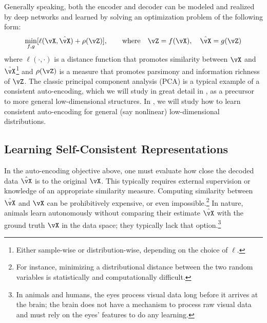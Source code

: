 \documentclass[../../book-main.tex]{subfiles}
\begin{document}
Generally speaking, both the encoder and decoder can be modeled and realized by deep networks and learned by solving an optimization problem of the following form:
\begin{equation}
   \min_{f, g} [\ell(\vX, \hat{\vX}) + \rho(\vZ)], \qquad \text{where} \quad \vZ = f(\vX), \quad \hat{\vX} = g(\vZ)
   \label{eqn:auto-encoding-objective}
\end{equation}
where \(\ell(\cdot, \cdot)\) is a distance function that promotes similarity between \(\vX\) and \(\hat{\vX}\)\footnote{Either sample-wise or distribution-wise, depending on the choice of \(\ell\).} and \(\rho(\vZ)\) is a measure that promotes parsimony and information richness of \(\vZ\). The classic principal component analysis (PCA) \cite{JolliffeI2002} is a typical example of a consistent auto-encoding, which we will study in great detail in , as a precursor to more general low-dimensional structures. In , we will study how to learn consistent auto-encoding for general (say nonlinear) low-dimensional distributions.  


\subsection{Learning Self-Consistent Representations}
In the auto-encoding objective above, one must evaluate how close the decoded data \(\hat{\vX}\) is to the original \(\vX\). This typically requires external supervision or knowledge of an appropriate similarity measure. Computing similarity between \(\hat{\vX}\) and \(\vX\) can be prohibitively expensive, or even impossible.\footnote{For instance, minimizing a distributional distance between the two random variables is statistically and computationally difficult.} In nature, animals learn autonomously without comparing their estimate \(\hat{\vX}\) with the ground truth \(\vX\) in the data space; they typically lack that option.\footnote{In animals and humans, the eyes process visual data long before it arrives at the brain; the brain does not have a mechanism to process raw visual data and must rely on the eyes' features to do any learning.}
\end{document}

